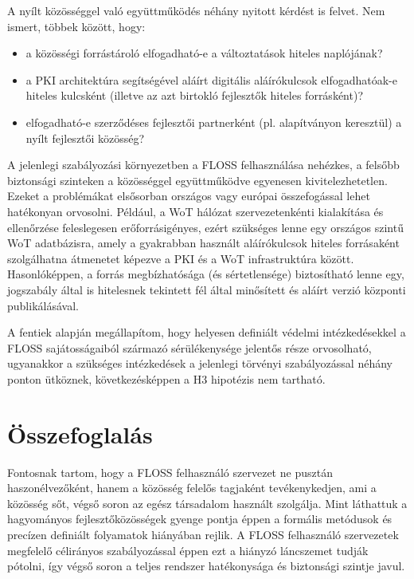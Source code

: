 \documentclass[12pt,magyar,a4paper,oneside]{scrreprt}
\providecommand{\tightlist}{%
  \setlength{\itemsep}{0pt}\setlength{\parskip}{0pt}}
\begin{document}
A nyílt közösséggel való együttműködés néhány nyitott kérdést is felvet.
Nem ismert, többek között, hogy:

\begin{itemize}
\tightlist
\item
  a közösségi forrástároló elfogadható-e a változtatások hiteles
  naplójának?
\item
  a PKI architektúra segítségével aláírt digitális aláírókulcsok
  elfogadhatóak-e hiteles kulcsként (illetve az azt birtokló fejlesztők
  hiteles forrásként)?
\item
  elfogadható-e szerződéses fejlesztői partnerként (pl. alapítványon
  keresztül) a nyílt fejlesztői közösség?
\end{itemize}

A jelenlegi szabályozási környezetben a FLOSS felhasználása nehézkes, a
felsőbb biztonsági szinteken a közösséggel együttműködve egyenesen
kivitelezhetetlen. Ezeket a problémákat elsősorban országos vagy európai
összefogással lehet hatékonyan orvosolni. Például, a WoT hálózat
szervezetenkénti kialakítása és ellenőrzése feleslegesen
erőforrásigényes, ezért szükséges lenne egy országos szintű WoT
adatbázisra, amely a gyakrabban használt aláírókulcsok hiteles
forrásaként szolgálhatna átmenetet képezve a PKI és a WoT infrastruktúra
között. Hasonlóképpen, a forrás megbízhatósága (és sértetlensége)
biztosítható lenne egy, jogszabály által is hitelesnek tekintett fél
által minősített és aláírt verzió központi publikálásával.

A fentiek alapján megállapítom, hogy helyesen definiált védelmi
intézkedésekkel a FLOSS sajátosságaiból származó sérülékenysége jelentős
része orvosolható, ugyanakkor a szükséges intézkedések a jelenlegi
törvényi szabályozással néhány ponton ütköznek, következésképpen a H3
hipotézis nem tartható.

\hypertarget{uxf6sszefoglaluxe1s-8}{%
\chapter{Összefoglalás}\label{uxf6sszefoglaluxe1s-8}}

Fontosnak tartom, hogy a FLOSS felhasználó szervezet ne pusztán
haszonélvezőként, hanem a közösség felelős tagjaként tevékenykedjen, ami
a közösség sőt, végső soron az egész társadalom használt szolgálja. Mint
láthattuk a hagyományos fejlesztőközösségek gyenge pontja éppen a
formális metódusok és precízen definiált folyamatok hiányában rejlik. A
FLOSS felhasználó szervezetek megfelelő célirányos szabályozással éppen
ezt a hiányzó láncszemet tudják pótolni, így végső soron a teljes
rendszer hatékonysága és biztonsági szintje javul.
\end{document}
